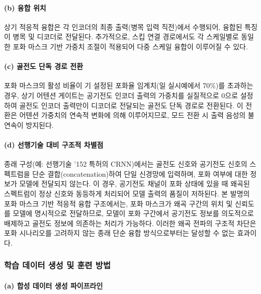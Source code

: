 \documentclass{article}
\begin{document}
\paragraph{(b) 융합 위치}

상기 적응적 융합은 각 인코더의 최종 출력(병목 입력 직전)에서 수행되어, 융합된 특징이 병목 및 디코더로 전달된다. 추가적으로, 스킵 연결 경로에서도 각 스케일별로 동일한 포화 마스크 기반 가중치 조절이 적용되어 다중 스케일 융합이 이루어질 수 있다.

\paragraph{(c) 골전도 단독 경로 전환}

포화 마스크의 활성 비율이 기 설정된 포화율 임계치(일 실시예에서 70\%)를 초과하는 경우, 상기 어텐션 게이트는 공기전도 인코더 출력의 가중치를 실질적으로 0으로 설정하여 골전도 인코더 출력만이 디코더로 전달되는 골전도 단독 경로로 전환된다. 이 전환은 어텐션 가중치의 연속적 변화에 의해 이루어지므로, 모드 전환 시 출력 음성의 불연속이 방지된다.

\paragraph{(d) 선행기술 대비 구조적 차별점}

종래 구성(예: 선행기술 '152 특허의 CRNN)에서는 골전도 신호와 공기전도 신호의 스펙트럼을 단순 결합(concatenation)하여 단일 신경망에 입력하며, 포화 여부에 대한 정보가 모델에 전달되지 않는다. 이 경우, 공기전도 채널이 포화 상태에 있을 때 왜곡된 스펙트럼이 정상 신호와 동등하게 처리되어 모델 출력의 품질이 저하된다. 본 발명의 포화 마스크 기반 적응적 융합 구조에서는, 포화 마스크가 왜곡 구간의 위치 및 신뢰도를 모델에 명시적으로 전달하므로, 모델이 포화 구간에서 공기전도 정보를 의도적으로 배제하고 골전도 정보에 의존하는 처리가 가능하다. 이러한 왜곡 전파의 구조적 차단은 포화 시나리오를 고려하지 않는 종래 단순 융합 방식으로부터는 달성할 수 없는 효과이다.

\subsubsection{학습 데이터 생성 및 훈련 방법}

\paragraph{(a) 합성 데이터 생성 파이프라인}
\end{document}

